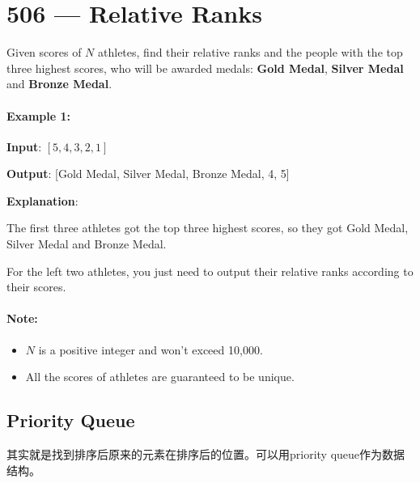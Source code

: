 \section{506 --- Relative Ranks}
Given scores of $N$ athletes, find their relative ranks and the people with the top three highest scores, who will be awarded medals: \textbf{Gold Medal}, \textbf{Silver Medal} and \textbf{Bronze Medal}.

\paragraph{Example 1:}

\begin{flushleft}
\textbf{Input}: $[5, 4, 3, 2, 1]$

\textbf{Output}: [Gold Medal, Silver Medal, Bronze Medal, 4, 5]

\textbf{Explanation}: 

The first three athletes got the top three highest scores, so they got Gold Medal, Silver Medal and Bronze Medal. 

For the left two athletes, you just need to output their relative ranks according to their scores.
\end{flushleft}

\paragraph{Note:}
\begin{itemize}
\item $N$ is a positive integer and won't exceed 10,000.
\item All the scores of athletes are guaranteed to be unique.
\end{itemize}

\subsection{Priority Queue}
其实就是找到排序后原来的元素在排序后的位置。可以用priority queue作为数据结构。

